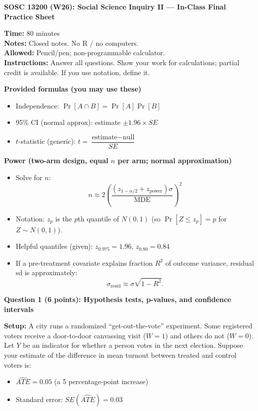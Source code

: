 \documentclass[12pt]{article}
\begin{document}
\begin{center}
\textbf{SOSC 13200 (W26): Social Science Inquiry II --- In-Class Final Practice Sheet}
\end{center}

\noindent\textbf{Time:} 80 minutes \\
\textbf{Notes:} Closed notes. No R / no computers. \\
\textbf{Allowed:} Pencil/pen; non-programmable calculator. \\
\textbf{Instructions:} Answer all questions. Show your work for calculations; partial credit is available. If you use notation, define it.

\vspace{0.5em}
\noindent\textbf{Provided formulas (you may use these)}
\begin{itemize}
  \item Independence: $\Pr[A\cap B]=\Pr[A]\Pr[B]$
  \item 95\% CI (normal approx): estimate $\pm 1.96\times SE$
  \item $t$-statistic (generic): $t=\dfrac{\text{estimate} - \text{null}}{SE}$
\end{itemize}

\noindent\textbf{Power (two-arm design, equal $n$ per arm; normal approximation)}
\begin{itemize}
  \item Solve for $n$:
  \[
  n \approx 2\left(\frac{(z_{1-\alpha/2}+z_{\text{power}})\sigma}{\text{MDE}}\right)^2
  \]
  \item Notation: $z_p$ is the $p$th quantile of $N(0,1)$ (so $\Pr[Z\le z_p]=p$ for $Z\sim N(0,1)$).
  \item Helpful quantiles (given): $z_{0.975}=1.96$, $z_{0.80}=0.84$
  \item If a pre-treatment covariate explains fraction $R^2$ of outcome variance, residual sd is approximately:
  \[
  \sigma_{\text{resid}} \approx \sigma\sqrt{1-R^2}.
  \]
\end{itemize}

\clearpage
\noindent\textbf{Question 1 (6 points): Hypothesis tests, p-values, and confidence intervals}

\noindent\textbf{Setup:} A city runs a randomized ``get-out-the-vote'' experiment. Some registered voters receive a door-to-door
canvassing visit ($W=1$) and others do not ($W=0$). Let $Y$ be an indicator for whether a person votes in the next election.
Suppose your estimate of the difference in mean turnout between treated and control voters is:
\begin{itemize}
  \item $\widehat{ATE}=0.05$ (a 5 percentage-point increase)
  \item Standard error: $SE(\widehat{ATE})=0.03$
\end{itemize}
\end{document}
